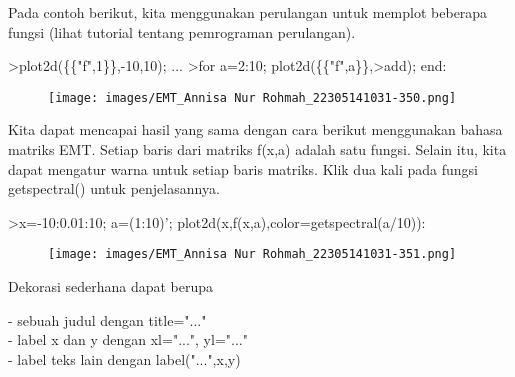 \documentclass[a4paper,10pt]{article}
\begin{document}
\begin{eulernotebook}
\begin{eulercomment}
Pada contoh berikut, kita menggunakan perulangan untuk memplot
beberapa fungsi (lihat tutorial tentang pemrograman perulangan).
\end{eulercomment}
\begin{eulerprompt}
>plot2d(\{\{"f",1\}\},-10,10); ...
>for a=2:10; plot2d(\{\{"f",a\}\},>add); end:
\end{eulerprompt}
\begin{figure}[h]
    \centering
    \texttt{[image: images/EMT\_Annisa Nur Rohmah\_22305141031-350.png]}
\end{figure}
\begin{eulercomment}
Kita dapat mencapai hasil yang sama dengan cara berikut menggunakan
bahasa matriks EMT. Setiap baris dari matriks f(x,a) adalah satu
fungsi. Selain itu, kita dapat mengatur warna untuk setiap baris
matriks. Klik dua kali pada fungsi getspectral() untuk penjelasannya.
\end{eulercomment}
\begin{eulerprompt}
>x=-10:0.01:10; a=(1:10)'; plot2d(x,f(x,a),color=getspectral(a/10)):
\end{eulerprompt}
\begin{figure}[h]
    \centering
    \texttt{[image: images/EMT\_Annisa Nur Rohmah\_22305141031-351.png]}
\end{figure}
\begin{eulercomment}
Dekorasi sederhana dapat berupa

- sebuah judul dengan title="..."\\
- label x dan y dengan xl="...", yl="..."\\
- label teks lain dengan label("...",x,y)


\end{eulercomment}
\end{eulernotebook}
\end{document}
